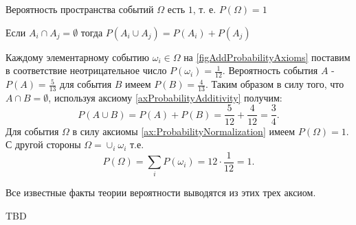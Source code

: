 \begin{axiom}[Нормировка]
  \label{ax:ProbabilityNormalization}
  Вероятность пространства событий $\Omega$ есть $1$, т. е.
  $P\left(\Omega\right) = 1$
\end{axiom}

\begin{axiom}[Аддитивность]
\label{axProbabilityAdditivity}
Если $A_i \cap A_j = \emptyset$ тогда 
$P\left(A_i \cup A_j\right) = P\left(A_i\right) + P\left(A_j\right)$
\end{axiom}

\begin{example}

Каждому элементарному событию $\omega_i \in \Omega$
на \autoref{figAddProbabilityAxioms} поставим в соответствие
неотрицательное число 
$P\left(\omega_i\right) = \frac{1}{12}$. Вероятность события $A$ - 
$P\left(A\right) = \frac{5}{13}$ для события $B$ имеем
$P\left(B\right) = \frac{4}{13}$. Таким образом в силу того, что 
$A \cap B = \emptyset$, используя аксиому
\ref{axProbabilityAdditivity} получим:
\[
P\left(A\cup B\right) = 
P\left(A\right) + P\left(B\right) = 
\frac{5}{12} + \frac{4}{12} = \frac{3}{4}.
\]
Для события $\Omega$ в силу аксиомы \ref{ax:ProbabilityNormalization}
имеем $P\left(\Omega\right) = 1$. С другой стороны 
$\Omega = \cup_i \omega_i$ т.е. 
\[
P\left(\Omega\right) = \sum_i P\left(\omega_i\right) =
12\cdot\frac{1}{12} = 1.
\]
\end{example}


Все известные факты теории вероятности выводятся из этих трех аксиом.  



TBD
